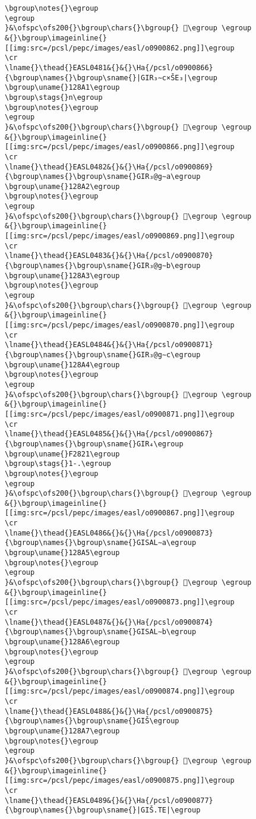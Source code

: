 \begin{verbatim}
\bgroup\notes{}\egroup
\egroup
}&\ofspc\ofs200{}\bgroup\chars{}\bgroup{} 𒢠\egroup \egroup
&{}\bgroup\imageinline{}[[img:src=/pcsl/pepc/images/easl/o0900862.png]]\egroup
\cr
\lname{}\thead{}EASL0481&{}&{}\Ha{/pcsl/o0900866}{\bgroup\names{}\bgroup\sname{}|GIR₃∼c×ŠE₃|\egroup
\bgroup\uname{}128A1\egroup
\bgroup\stags{}n\egroup
\bgroup\notes{}\egroup
\egroup
}&\ofspc\ofs200{}\bgroup\chars{}\bgroup{} 𒢡\egroup \egroup
&{}\bgroup\imageinline{}[[img:src=/pcsl/pepc/images/easl/o0900866.png]]\egroup
\cr
\lname{}\thead{}EASL0482&{}&{}\Ha{/pcsl/o0900869}{\bgroup\names{}\bgroup\sname{}GIR₃@g∼a\egroup
\bgroup\uname{}128A2\egroup
\bgroup\notes{}\egroup
\egroup
}&\ofspc\ofs200{}\bgroup\chars{}\bgroup{} 𒢢\egroup \egroup
&{}\bgroup\imageinline{}[[img:src=/pcsl/pepc/images/easl/o0900869.png]]\egroup
\cr
\lname{}\thead{}EASL0483&{}&{}\Ha{/pcsl/o0900870}{\bgroup\names{}\bgroup\sname{}GIR₃@g∼b\egroup
\bgroup\uname{}128A3\egroup
\bgroup\notes{}\egroup
\egroup
}&\ofspc\ofs200{}\bgroup\chars{}\bgroup{} 𒢣\egroup \egroup
&{}\bgroup\imageinline{}[[img:src=/pcsl/pepc/images/easl/o0900870.png]]\egroup
\cr
\lname{}\thead{}EASL0484&{}&{}\Ha{/pcsl/o0900871}{\bgroup\names{}\bgroup\sname{}GIR₃@g∼c\egroup
\bgroup\uname{}128A4\egroup
\bgroup\notes{}\egroup
\egroup
}&\ofspc\ofs200{}\bgroup\chars{}\bgroup{} 𒢤\egroup \egroup
&{}\bgroup\imageinline{}[[img:src=/pcsl/pepc/images/easl/o0900871.png]]\egroup
\cr
\lname{}\thead{}EASL0485&{}&{}\Ha{/pcsl/o0900867}{\bgroup\names{}\bgroup\sname{}GIR₄\egroup
\bgroup\uname{}F2821\egroup
\bgroup\stags{}1-.\egroup
\bgroup\notes{}\egroup
\egroup
}&\ofspc\ofs200{}\bgroup\chars{}\bgroup{} 󲠡\egroup \egroup
&{}\bgroup\imageinline{}[[img:src=/pcsl/pepc/images/easl/o0900867.png]]\egroup
\cr
\lname{}\thead{}EASL0486&{}&{}\Ha{/pcsl/o0900873}{\bgroup\names{}\bgroup\sname{}GISAL∼a\egroup
\bgroup\uname{}128A5\egroup
\bgroup\notes{}\egroup
\egroup
}&\ofspc\ofs200{}\bgroup\chars{}\bgroup{} 𒢥\egroup \egroup
&{}\bgroup\imageinline{}[[img:src=/pcsl/pepc/images/easl/o0900873.png]]\egroup
\cr
\lname{}\thead{}EASL0487&{}&{}\Ha{/pcsl/o0900874}{\bgroup\names{}\bgroup\sname{}GISAL∼b\egroup
\bgroup\uname{}128A6\egroup
\bgroup\notes{}\egroup
\egroup
}&\ofspc\ofs200{}\bgroup\chars{}\bgroup{} 𒢦\egroup \egroup
&{}\bgroup\imageinline{}[[img:src=/pcsl/pepc/images/easl/o0900874.png]]\egroup
\cr
\lname{}\thead{}EASL0488&{}&{}\Ha{/pcsl/o0900875}{\bgroup\names{}\bgroup\sname{}GIŠ\egroup
\bgroup\uname{}128A7\egroup
\bgroup\notes{}\egroup
\egroup
}&\ofspc\ofs200{}\bgroup\chars{}\bgroup{} 𒢧\egroup \egroup
&{}\bgroup\imageinline{}[[img:src=/pcsl/pepc/images/easl/o0900875.png]]\egroup
\cr
\lname{}\thead{}EASL0489&{}&{}\Ha{/pcsl/o0900877}{\bgroup\names{}\bgroup\sname{}|GIŠ.TE|\egroup

\end{verbatim}
